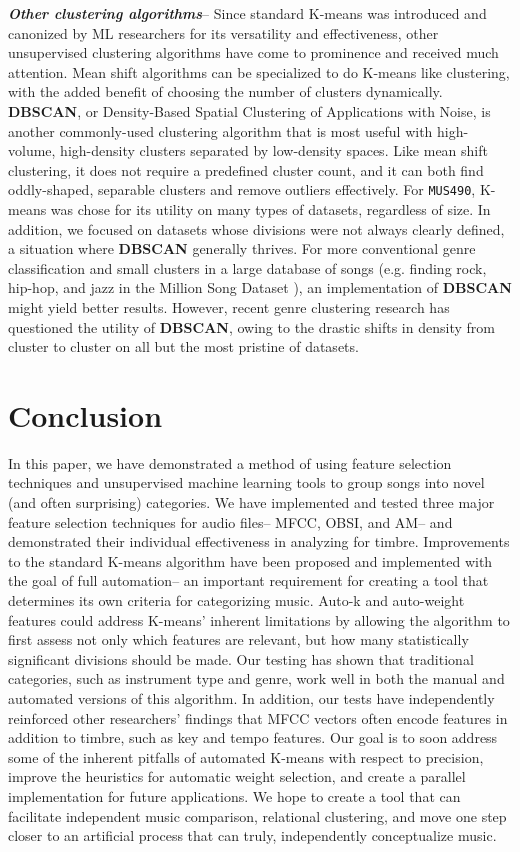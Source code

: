 \documentclass[12pt,twocolumn,titlepage]{article}
\begin{document}
\emph{\textbf{Other clustering algorithms}}-- Since standard K-means was introduced and canonized by ML researchers for its versatility and effectiveness, other unsupervised clustering algorithms have come to prominence and received much attention. Mean shift algorithms can be specialized to do K-means like clustering, with the added benefit of choosing the number of clusters dynamically. \cite{MeanShift} \textbf{DBSCAN}, or Density-Based Spatial Clustering of Applications with Noise, is another commonly-used clustering algorithm that is most useful with high-volume, high-density clusters separated by low-density spaces. Like mean shift clustering, it does not require a predefined cluster count, and it can both find oddly-shaped, separable clusters and remove outliers effectively.
For \texttt{MUS490}, K-means was chose for its utility on many types of datasets, regardless of size. In addition, we focused on datasets whose divisions were not always clearly defined, a situation where \textbf{DBSCAN} generally thrives. For more conventional genre classification and small clusters in a large database of songs (e.g. finding rock, hip-hop, and jazz in the Million Song Dataset \cite{Bertin-Mahieux2011}), an implementation of \textbf{DBSCAN} might yield better results. However, recent genre clustering research has questioned the utility of \textbf{DBSCAN}, owing to the drastic shifts in density from cluster to cluster on all but the most pristine of datasets. \cite{DBSCAN}


\section{Conclusion}
\label{sec:conclusion}

In this paper, we have demonstrated a method of using feature selection techniques and unsupervised machine learning tools to group songs into novel (and often surprising) categories. We have implemented and tested three major feature selection techniques for audio files-- MFCC, OBSI, and AM-- and demonstrated their individual effectiveness in analyzing for timbre. Improvements to the standard K-means algorithm have been proposed and implemented with the goal of full automation-- an important requirement for creating a tool that determines its own criteria for categorizing music. Auto-k and auto-weight features could address K-means' inherent limitations by allowing the algorithm to first assess not only which features are relevant, but how many statistically significant divisions should be made. Our testing has shown that traditional categories, such as instrument type and genre, work well in both the manual and automated versions of this algorithm. In addition, our tests have independently reinforced other researchers' findings that MFCC vectors often encode features in addition to timbre, such as key and tempo features. Our goal is to soon address some of the inherent pitfalls of automated K-means with respect to precision, improve the heuristics for automatic weight selection, and create a parallel implementation for future applications. We hope to create a tool that can facilitate independent music comparison, relational clustering, and move one step closer to an artificial process that can truly, independently conceptualize music.





\end{document}
